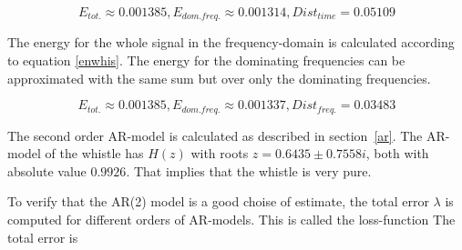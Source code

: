 \documentclass[12pt]{article}
\begin{document}
\begin{equation}
E_{tot.} \approx 0.001385, E_{dom. freq.}\approx 0.001314, Dist_{time} = 0.05109
\end{equation}

The energy for the whole signal in the frequency-domain is calculated according to equation \ref{enwhis}. The energy for the dominating frequencies can be approximated with the same sum but over only the dominating frequencies. 

\begin{equation}
E_{tot.} \approx 0.001385, E_{dom. freq.}\approx 0.001337, Dist_{freq.} = 0.03483
\end{equation}



The second order AR-model is calculated as described in section~\ref{ar}.  The AR-model of the whistle has $H(z)$ with roots $z=0.6435 \pm 0.7558i$, both with absolute value $0.9926$. That implies that the whistle is very pure. 

To verify that the AR(2) model is a good choise of estimate, the total error $\lambda$ is computed for different orders of AR-models. This is called the loss-function The total error is 
\end{document}
